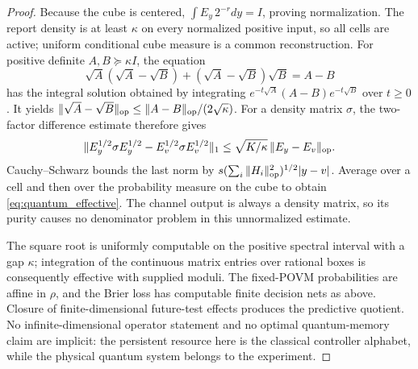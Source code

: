 \begin{proof}
Because the cube is centered, $\int E_y\,2^{-r}dy=I$, proving normalization. The report density is at least $\kappa$ on every normalized positive input, so all cells are active; uniform conditional cube measure is a common reconstruction. For positive definite $A,B\succeq\kappa I$, the equation
\[
 \sqrt A(\sqrt A-\sqrt B)+(\sqrt A-\sqrt B)\sqrt B=A-B
\]
has the integral solution obtained by integrating
$e^{-t\sqrt A}(A-B)e^{-t\sqrt B}$ over $t\ge0$. It yields
$\|\sqrt A-\sqrt B\|_{\rm op}\le\|A-B\|_{\rm op}/(2\sqrt\kappa)$.
For a density matrix $\sigma$, the two-factor difference estimate therefore gives
\[
 \|E_y^{1/2}\sigma E_y^{1/2}-E_v^{1/2}\sigma E_v^{1/2}\|_1
 \le \sqrt{K/\kappa}\,\|E_y-E_v\|_{\rm op}.
\]
Cauchy--Schwarz bounds the last norm by
$s(\sum_i\|H_i\|_{\rm op}^2)^{1/2}|y-v|$.
Average over a cell and then over the probability measure on the cube to obtain \eqref{eq:quantum_effective}. The channel output is always a density matrix, so its purity causes no denominator problem in this unnormalized estimate.

The square root is uniformly computable on the positive spectral interval with a gap $\kappa$; integration of the continuous matrix entries over rational boxes is consequently effective with supplied moduli. The fixed-POVM probabilities are affine in $\rho$, and the Brier loss has computable finite decision nets as above. Closure of finite-dimensional future-test effects produces the predictive quotient. No infinite-dimensional operator statement and no optimal quantum-memory claim are implicit: the persistent resource here is the classical controller alphabet, while the physical quantum system belongs to the experiment.
\end{proof}

